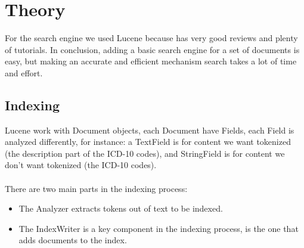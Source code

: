 \chapter{Theory}
\label{cha:theory}

For the search engine we used Lucene because has very good reviews and plenty of
tutorials.  In conclusion, adding a basic search engine for a set of documents
is easy, but making an accurate and efficient mechanism search takes a lot of
time and effort.

\section{Indexing}
\label{sec:indexing}

Lucene work with Document objects, each Document have Fields, each Field is
analyzed differently, for instance: a TextField is for content we want tokenized
(the description part of the ICD-10 codes), and StringField is for content we
don't want tokenized (the ICD-10 codes).\\
\\
There are two main parts in the indexing process:

\begin{itemize}
\item The Analyzer extracts tokens out of text to be indexed.

\item The IndexWriter is a key component in the indexing process, is the one
			that adds documents to the index.
\end{itemize}


